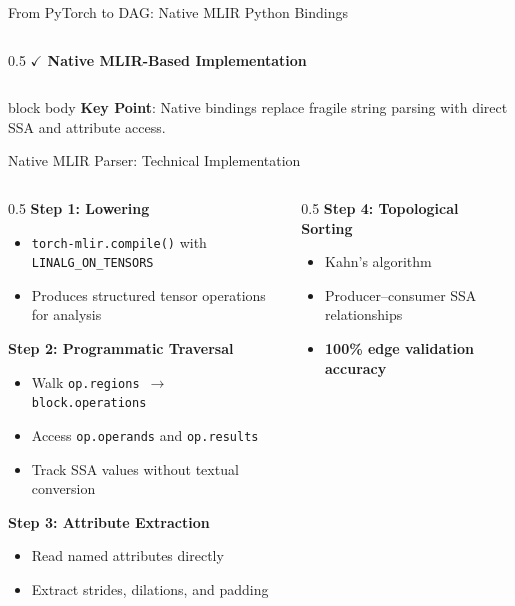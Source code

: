 \documentclass[10pt,aspectratio=169]{beamer}
\begin{document}
\begin{frame}{From PyTorch to DAG: Native MLIR Python Bindings}
\begin{columns}
\begin{column}{0.5\textwidth}
\vspace{0.15cm}
\textcolor{edgegreen}{\textbf{$\checkmark$ Native MLIR-Based Implementation}}
\end{column}
\end{columns}

\vspace{0.25cm}
\begin{beamercolorbox}[sep=0.3em,center,rounded=true,shadow=true]{block body}
\small
\textbf{Key Point}: Native bindings replace fragile string parsing with direct SSA and attribute access.
\end{beamercolorbox}
\end{frame}

\begin{frame}{Native MLIR Parser: Technical Implementation}
\begin{columns}
\begin{column}{0.5\textwidth}
\textbf{Step 1: Lowering}
\begin{itemize}
\small
\item \texttt{torch-mlir.compile()} with \texttt{LINALG\_ON\_TENSORS}
\item Produces structured tensor operations for analysis
\end{itemize}

\vspace{0.15cm}
\textbf{Step 2: Programmatic Traversal}
\begin{itemize}
\small
\item Walk \texttt{op.regions $\to$ block.operations}
\item Access \texttt{op.operands} and \texttt{op.results}
\item Track SSA values without textual conversion
\end{itemize}

\vspace{0.15cm}
\textbf{Step 3: Attribute Extraction}
\begin{itemize}
\small
\item Read named attributes directly
\item Extract strides, dilations, and padding
\end{itemize}
\end{column}

\begin{column}{0.5\textwidth}
\textbf{Step 4: Topological Sorting}
\begin{itemize}
\small
\item Kahn's algorithm
\item Producer--consumer SSA relationships
\item \textbf{100\% edge validation accuracy}
\end{itemize}


\end{column}
\end{columns}
\end{frame}
\end{document}
